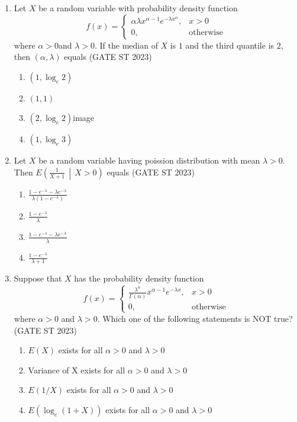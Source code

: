 \documentclass[journal]{IEEEtran}
\begin{document}
\begin{enumerate}[label=\textbf{Q.\arabic*.}, start=11, align=left, itemsep=2em]
\item Let $X$ be a random variable with probability density function
\[ f(x) = \begin{cases}
\alpha \lambda x^{\alpha - 1} e^{ - \lambda x^{\alpha}}, & x>0 \\
0, & \text{otherwise}
\end{cases} \]
where $\alpha > 0$and $\lambda > 0$. If the median of $X$ is $1$ and the third quantile is $2$, then $(\alpha, \lambda)$ equals \hfill(GATE ST 2023) 
\begin{enumerate}
    \item $(1, \log_e 2)$
    \item $(1, 1)$
    \item $(2, \log_e 2)$image
    \item $(1, \log_e 3)$
\end{enumerate}

\item Let $X$ be a random variable having poission distribution with mean $\lambda > 0$. Then $E\left( \frac{1}{X+1} \,\middle|\, X > 0\right)$ equals  \hfill(GATE ST 2023)
\begin{enumerate}
    \item $\frac{1 - e^{-\lambda} - \lambda e^{-\lambda}}{\lambda (1 - e^{-\lambda})}$
    \item $\frac{1 - e^{-\lambda}}{\lambda}$
    \item $\frac{1 - e^{-\lambda} - \lambda e^{-\lambda}}{\lambda}$
    \item $\frac{1 - e^{-\lambda}}{\lambda + 1}$
\end{enumerate}

\item Suppose that $X$ has the probability density function
\[ f(x) = \begin{cases}
\frac{\lambda^\alpha}{\Gamma(\alpha)} x^{\alpha - 1} e^{-\lambda x}, & x>0 \\
0, & \text{otherwise}
\end{cases} \]
where $\alpha > 0$ and $\lambda > 0$. Which one of the following statements is NOT true? \hfill(GATE ST 2023) 
\begin{enumerate}
    \item $E(X)$ exists for all $\alpha > 0$ and $\lambda > 0$
    \item Variance of X exists for all $\alpha > 0$ and $\lambda > 0$
    \item $E(1/X)$ exists for all $\alpha > 0$ and $\lambda > 0$
    \item $E(\log_e(1+X))$ exists for all $\alpha > 0$ and $\lambda > 0$
\end{enumerate}


\end{enumerate}
\end{document}
